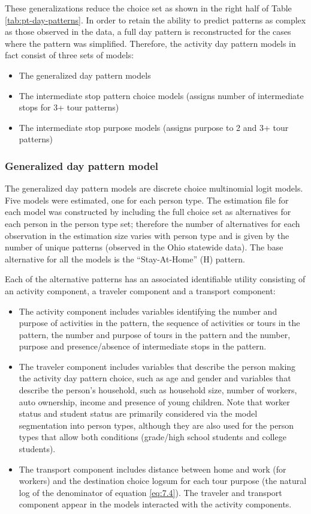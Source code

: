 These generalizations reduce the choice set as shown in the right half of Table \ref{tab:pt-day-patterns}. In order to retain the ability to predict patterns as complex as those observed in the data, a full day pattern is reconstructed for the cases where the pattern was simplified. Therefore, the activity day pattern models in fact consist of three sets of models:
\begin{itemize}
\item The generalized day pattern models
\item The intermediate stop pattern choice models (assigns number of intermediate stops for 3+ tour patterns)
\item The intermediate stop purpose models (assigns purpose to 2 and 3+ tour patterns)
\end{itemize}

\subsubsection{Generalized day pattern model}
The generalized day pattern models are discrete choice multinomial logit models. Five models were estimated, one for each person type. The estimation file for each model was constructed by including the full choice set as alternatives for each person in the person type set; therefore the number of alternatives for each observation in the estimation size varies with person type and is given by the number of unique patterns (observed in the Ohio statewide data). The base alternative for all the models is the ``Stay-At-Home'' (H) pattern. 

Each of the alternative patterns has an associated identifiable utility consisting of an activity component, a traveler component and a transport component:
\begin{itemize}
\item The activity component includes variables identifying the number and purpose of activities in the pattern, the sequence of activities or tours in the pattern, the number and purpose of tours in the pattern and the number, purpose and presence/absence of intermediate stops in the pattern.
\item The traveler component includes variables that describe the person making the activity day pattern choice, such as age and gender and variables that describe the person's household, such as household size, number of workers, auto ownership, income and presence of young children. Note that worker status and student status are primarily considered via the model segmentation into person types, although they are also used for the person types that allow both conditions (grade/high school students and college students).
\item The transport component includes distance between home and work (for workers) and the destination choice logsum for each tour purpose (the natural log of the denominator of equation \ref{eq:7.4}). The traveler and transport component appear in the models interacted with the activity components.
\end{itemize}

